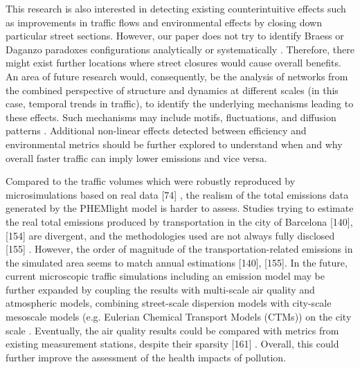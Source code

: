 This research is also interested in detecting existing counterintuitive effects such as improvements in traffic flows and environmental effects by closing down particular street sections. However, our paper does not try to identify Braess or Daganzo paradoxes configurations analytically or systematically \citep{Bagloee2019,Burov2021,Akamatsu2003}. Therefore, there might exist further locations where street closures would cause overall benefits. An area of future research would, consequently, be the analysis of networks from the combined perspective of structure and dynamics at different scales (in this case, temporal trends in traffic), to identify the underlying mechanisms leading to these effects. Such mechanisms may include motifs, fluctuations, and diffusion patterns \citep{Battiston2020,Arnaudon2020}. Additional non-linear effects detected between efficiency and environmental metrics should be further explored to understand when and why overall faster traffic can imply lower emissions and vice versa.

Compared to the traffic volumes which were robustly reproduced by microsimulations based on real data [74] \citep{ArgotaSanchez-Vaquerizo2021}, the realism of the total emissions data generated by the PHEMlight model is harder to assess. Studies trying to estimate the real total emissions produced by transportation in the city of Barcelona [140], [154] \citep{AgenciaLocaldEnergiadeBarcelona2022,Polo2021} are divergent, and the methodologies used are not always fully disclosed [155] \citep{Cerrillo2020}. However, the order of magnitude of the transportation-related emissions in the simulated area seems to match annual estimations [140], [155]. In the future, current microscopic traffic simulations including an emission model may be further expanded by coupling the results with multi-scale air quality and atmospheric models, combining street-scale dispersion models \citep{Holmes2006,Vardoulakis2003} with city-scale mesoscale models (e.g. Eulerian Chemical Transport Models (CTMs)) on the city scale \citep{Rodriguez-Rey2022,Brandt2003,Benavides2019,Borge2014}. Eventually, the air quality results could be compared with metrics from existing measurement stations, despite their sparsity [161] \citep{Kumar2015}. Overall, this could further improve the assessment of the health impacts of pollution.

